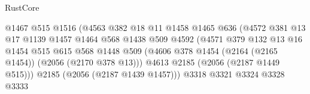 \begin{lexlean}{RustCore}
\begin{coremodule}
                                            @1467
                                            @515
                                            @1516
                                            (@4563
                                              @382
                                              @18
                                              @11
                                              @1458
                                              @1465
                                              @636
                                              (@4572
                                                @381
                                                @13
                                                @17
                                                @1139
                                                @1457
                                                @1464
                                                @568
                                                @1438
                                                @509
                                                @4592
                                                (@4571
                                                  @379
                                                  @132
                                                  @13
                                                  @16
                                                  @1454
                                                  @515
                                                  @615
                                                  @568
                                                  @1448
                                                  @509
                                                  (@4606
                                                    @378
                                                    @1454
                                                    (@2164 (@2165 @1454))
                                                    (@2056 (@2170 @378 @13)))
                                                  @4613
                                                  @2185
                                                  (@2056 (@2187 @1449 @515)))
                                                @2185
                                                (@2056 (@2187 @1439 @1457)))
                                              @3318
                                              @3321
                                              @3324
                                              @3328
                                              @3333

\end{coremodule}
\end{lexlean}
